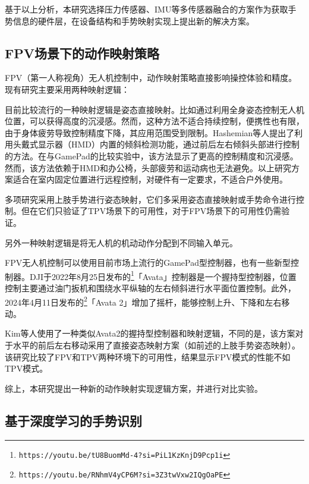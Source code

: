 基于以上分析，本研究选择压力传感器、IMU等多传感器融合的方案作为获取手势信息的硬件层，在设备结构和手势映射实现上提出新的解决方案。

\subsection{FPV场景下的动作映射策略}\label{ssec:FPV-drone-rc}

FPV（第一人称视角）无人机控制中，动作映射策略直接影响操控体验和精度。现有研究主要采用两种映射逻辑：

目前比较流行的一种映射逻辑是姿态直接映射。比如通过利用全身姿态控制无人机位置，可以获得高度的沉浸感\cite{cherpillod2019embodied,rognon2018flyjacket}。然而，这种方法不适合持续控制，便携性也有限，由于身体疲劳导致控制精度下降，其应用范围受到限制。Hashemian等人\cite{hashemian2020headjoystick}提出了利用头戴式显示器（HMD）内置的倾斜检测功能，通过前后左右倾斜头部进行控制的方法。在与GamePad的比较实验中，该方法显示了更高的控制精度和沉浸感。然而，该方法依赖于HMD和办公椅，头部疲劳和运动病也无法避免。以上研究方案适合在室内固定位置进行远程控制，对硬件有一定要求，不适合户外使用。

多项研究采用上肢手势进行姿态映射\cite{mughees2020gesture,budiyanto2021navigation,muezzinouglu2021intelligent,lee2023wearable,cherpillod2019embodied,kim2022intuitive}，它们多采用姿态直接映射或手势命令进行控制。但在它们只验证了TPV场景下的可用性，对于FPV场景下的可用性仍需验证。

另外一种映射逻辑是将无人机的机动动作分配到不同输入单元。

FPV无人机控制可以使用目前市场上流行的GamePad型控制器，也有一些新型控制器。DJI于2022年8月25日发布的\footnote{\texttt{https://youtu.be/tU8BuomMd-4?si=PiL1KzKnjD9Pcp1i}}「Avata」控制器是一个握持型控制器，位置控制主要通过油门扳机和围绕水平纵轴的左右倾斜进行水平面位置控制。此外，2024年4月11日发布的\footnote{\texttt{https://youtu.be/RNhmV4yCP6M?si=3Z3twVxw2IQgOaPE}}「Avata 2」增加了摇杆，能够控制上升、下降和左右移动。

Kim等人\cite{kim2022intuitive}使用了一种类似Avata2的握持型控制器和映射逻辑，不同的是，该方案对于水平的前后左右移动采用了直接姿态映射方案（如前述的上肢手势姿态映射\cite{mughees2020gesture}）。该研究比较了FPV和TPV两种环境下的可用性，结果显示FPV模式的性能不如TPV模式。

综上，本研究提出一种新的动作映射实现逻辑方案，并进行对比实验。

\subsection{基于深度学习的手势识别}

